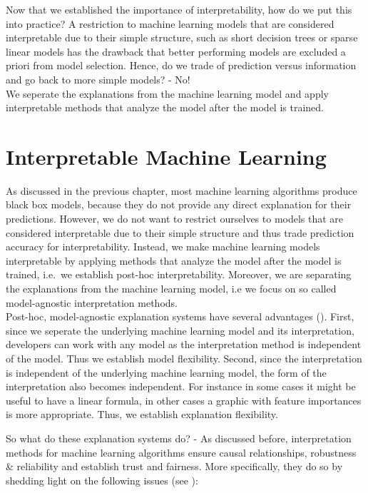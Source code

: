 \documentclass[]{krantz}
\begin{document}
Now that we established the importance of interpretability, how do we
put this into practice? A restriction to machine learning models that
are considered interpretable due to their simple structure, such as
short decision trees or sparse linear models has the drawback that
better performing models are excluded a priori from model selection.
Hence, do we trade of prediction versus information and go back to more
simple models? - No!\\
We seperate the explanations from the machine learning model and apply
interpretable methods that analyze the model after the model is trained.

\section{Interpretable Machine
Learning}\label{interpretable-machine-learning}

As discussed in the previous chapter, most machine learning algorithms
produce black box models, because they do not provide any direct
explanation for their predictions. However, we do not want to restrict
ourselves to models that are considered interpretable due to their
simple structure and thus trade prediction accuracy for
interpretability. Instead, we make machine learning models interpretable
by applying methods that analyze the model after the model is trained,
i.e.~we establish post-hoc interpretability. Moreover, we are separating
the explanations from the machine learning model, i.e we focus on so
called model-agnostic interpretation methods.\\
Post-hoc, model-agnostic explanation systems have several advantages
(\citet{ribeiro2016model}). First, since we seperate the underlying
machine learning model and its interpretation, developers can work with
any model as the interpretation method is independent of the model. Thus
we establish model flexibility. Second, since the interpretation is
independent of the underlying machine learning model, the form of the
interpretation also becomes independent. For instance in some cases it
might be useful to have a linear formula, in other cases a graphic with
feature importances is more appropriate. Thus, we establish explanation
flexibility.

So what do these explanation systems do? - As discussed before,
interpretation methods for machine learning algorithms ensure causal
relationships, robustness \& reliability and establish trust and
fairness. More specifically, they do so by shedding light on the
following issues (see \citet{molnar2019}):
\end{document}
